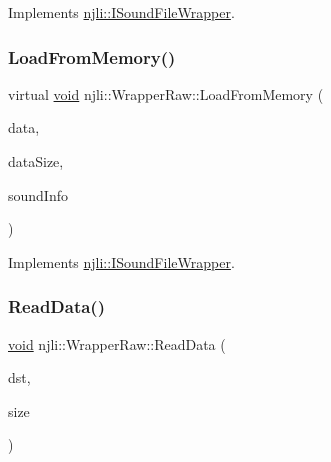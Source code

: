 Implements \mbox{\hyperlink{classnjli_1_1_i_sound_file_wrapper_a525f86e4bbe65d5b90ee3eda171b5492}{njli\+::\+I\+Sound\+File\+Wrapper}}.

\mbox{\label{classnjli_1_1_wrapper_raw_aca473a80ec7a02e3df6a74b171c2d1fb}} 
\subsubsection{\texorpdfstring{Load\+From\+Memory()}{LoadFromMemory()}}
{\footnotesize\ttfamily virtual \mbox{\hyperlink{_thread_8h_af1e856da2e658414cb2456cb6f7ebc66}{void}} njli\+::\+Wrapper\+Raw\+::\+Load\+From\+Memory (\begin{DoxyParamCaption}\item[{char $\ast$}]{data,  }\item[{int}]{data\+Size,  }\item[{Sound\+Info $\ast$}]{sound\+Info }\end{DoxyParamCaption})\hspace{0.3cm}{\ttfamily [virtual]}}



Implements \mbox{\hyperlink{classnjli_1_1_i_sound_file_wrapper_a2c4dc8cc613f8f545b0e1ead86ee7e4d}{njli\+::\+I\+Sound\+File\+Wrapper}}.

\mbox{\label{classnjli_1_1_wrapper_raw_a0cb793500d35360b2c404e2d8f20ced4}} 
\subsubsection{\texorpdfstring{Read\+Data()}{ReadData()}}
{\footnotesize\ttfamily \mbox{\hyperlink{_thread_8h_af1e856da2e658414cb2456cb6f7ebc66}{void}} njli\+::\+Wrapper\+Raw\+::\+Read\+Data (\begin{DoxyParamCaption}\item[{\mbox{\hyperlink{_thread_8h_af1e856da2e658414cb2456cb6f7ebc66}{void}} $\ast$}]{dst,  }\item[{size\+\_\+t}]{size }\end{DoxyParamCaption})\hspace{0.3cm}{\ttfamily [private]}}

